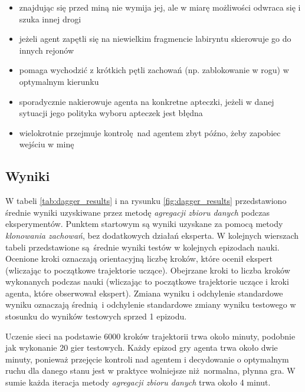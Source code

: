 \begin{itemize}
\item{znajdując się przed miną nie wymija jej, ale w miarę możliwości odwraca się i szuka innej drogi}
\item{jeżeli agent zapętli się na niewielkim fragmencie labiryntu skierowuje go do innych rejonów}
\item{pomaga wychodzić z krótkich pętli zachowań (np. zablokowanie w rogu) w optymalnym kierunku}
\item{sporadycznie nakierowuje agenta na konkretne apteczki, jeżeli w danej sytuacji jego polityka wyboru apteczek jest błędna}
\item{wielokrotnie przejmuje kontrolę nad agentem zbyt późno, żeby zapobiec wejściu w minę}
\end{itemize}


\subsection{Wyniki}\label{dagger_results}
W tabeli \ref{tab:dagger_results} i na rysunku \ref{fig:dagger_results} przedstawiono średnie wyniki uzyskiwane przez metodę \textit{agregacji zbioru danych} podczas eksperymentów. Punktem startowym są wyniki uzyskane za pomocą metody \textit{klonowania zachowań}, bez dodatkowych działań eksperta. W kolejnych wierszach tabeli przedstawione są średnie wyniki testów w kolejnych epizodach nauki. Ocenione kroki oznaczają orientacyjną liczbę kroków, które ocenił ekspert (wliczając to początkowe trajektorie uczące). Obejrzane kroki to liczba kroków wykonanych podczas nauki (wliczając to początkowe trajektorie uczące i kroki agenta, które obserwował ekspert). Zmiana wyniku i odchylenie standardowe wyniku oznaczają średnią i odchylenie standardowe zmiany wyniku testowego w stosunku do wyników testowych sprzed 1 epizodu. 

Uczenie sieci na podstawie 6000 kroków trajektorii trwa około minuty, podobnie jak wykonanie 20 gier testowych. Każdy epizod gry agenta trwa około dwie minuty, ponieważ przejęcie kontroli nad agentem i decydowanie o optymalnym ruchu dla danego stanu jest w praktyce wolniejsze niż normalna, płynna gra. W sumie każda iteracja metody \textit{agregacji zbioru danych} trwa około 4 minut.

